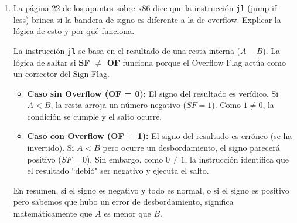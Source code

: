 \documentclass[a4paper, 11pt]{article}
\newcommand{\Pspace}{0.5cm}
\newcommand{\Aspace}{0.2cm}
\newcommand{\asm}[1]{\texttt{#1}}
\begin{document}
\begin{enumerate}
    \vspace{\Pspace}
\item La página 22 de los \href{https://unisonmx.sharepoint.com/sites/Arquitecturadecomputadoras2026-1/Class%20Materials/Slides/09-x86-Overview.pdf#page=22}{apuntes sobre x86} dice que la instrucción \texttt{jl} (jump if less) brinca si la bandera de signo es diferente a la de overflow. Explicar la lógica de esto y por qué funciona. \par
        \vspace{\Aspace} \par
        { \color{azul}
            La instrucción \asm{jl} se basa en el resultado de una resta interna ($A - B$). La lógica de saltar si \textbf{SF $\neq$ OF} funciona porque el Overflow Flag actúa como un corrector del Sign Flag.
            \begin{itemize}
                \item \textbf{Caso sin Overflow (OF = 0):} El signo del resultado es verídico. Si $A < B$, la resta arroja un número negativo ($SF = 1$). Como $1 \neq 0$, la condición se cumple y el salto ocurre.
                \item \textbf{Caso con Overflow (OF = 1):} El signo del resultado es erróneo (se ha invertido). Si $A < B$ pero ocurre un desbordamiento, el signo parecerá positivo ($SF = 0$). Sin embargo, como $0 \neq 1$, la instrucción identifica que el resultado ``debió" ser negativo y ejecuta el salto.
            \end{itemize}

            En resumen, si el signo es negativo y todo es normal, o si el signo es positivo pero sabemos que hubo un error de desbordamiento, significa matemáticamente que $A$ es menor que $B$. 
        }
    \end{enumerate}
\end{document}
